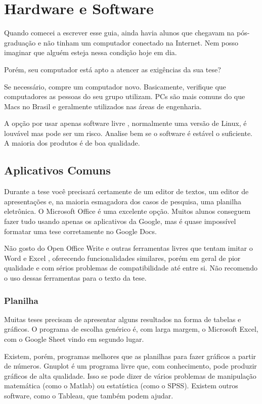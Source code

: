 \chapter{Hardware e Software}

Quando comecei a escrever esse guia, ainda havia alunos que chegavam na pós-graduação e não tinham um computador conectado na Internet. Nem posso imaginar que alguém esteja nessa condição hoje em dia.

Porém, seu computador está apto a atencer as exigências da sua tese? 

Se necessário, compre um computador novo. Basicamente, verifique que computadores as pessoas do seu grupo utilizam. PCs são mais comuns do que Macs no Brasil e geralmente utilizados nas áreas de engenharia.

A opção por usar apenas software livre , normalmente uma versão de Linux, é louvável mas pode ser um risco. Analise bem se o software é estável o suficiente. A maioria dos produtos é de boa qualidade. 



\section{Aplicativos Comuns}

Durante a tese você precisará certamente de um editor de textos, um editor de apresentações e, na maioria esmagadora dos casos de pesquisa, uma planilha eletrônica. O Microsoft Office é uma excelente opção. Muitos alunos conseguem fazer tudo usando apenas os aplicativos da Google, mas é quase impossível formatar uma tese corretamente no Google Docs.

Não gosto do Open Office Write e outras ferramentas livres que tentam imitar o Word e Excel , oferecendo funcionalidades similares, porém em geral de pior qualidade e com sérios problemas de compatibilidade até entre si. Não recomendo o uso dessas ferramentas para o texto da tese.

\subsection{Planilha}

Muitas teses precisam de apresentar alguns resultados na forma de tabelas e gráficos. O programa de escolha genérico é, com larga margem, o Microsoft Excel, com o Google Sheet vindo em segundo lugar. 


Existem, porém, programas melhores que as planilhas para fazer gráficos a partir de números. Gnuplot é um programa livre que, com conhecimento, pode produzir gráficos de alta qualidade. Isso se pode dizer de vários problemas de manipulação matemática (como o Matlab) ou estatística (como o SPSS).
Existem outros software, como o Tableau, que também podem ajudar.


